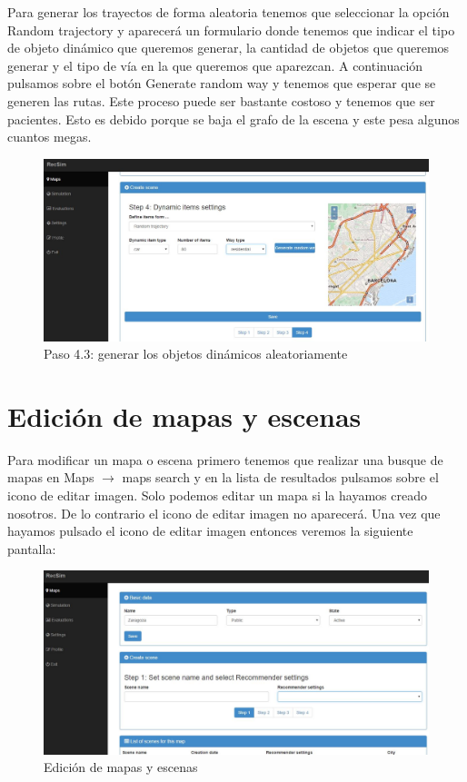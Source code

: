 Para generar los trayectos de forma aleatoria tenemos que seleccionar la opción Random trajectory y aparecerá un formulario donde tenemos que indicar el tipo de objeto dinámico que queremos generar, la cantidad de objetos que queremos generar y el tipo de vía en la que queremos que aparezcan. A continuación pulsamos sobre el botón Generate random way y tenemos que esperar que se generen las rutas. Este proceso puede ser bastante costoso y tenemos que ser pacientes. Esto es debido porque se baja el grafo de la escena y este pesa algunos cuantos megas.

\begin{figure}[H]
	\centering\includegraphics[scale=0.35]{imagenes/capitulo9/crear-escena-5.JPG}
	\caption{Paso 4.3: generar los objetos dinámicos aleatoriamente}
	\label{img:paso4-3}
\end{figure}

\section{Edición de mapas y escenas}\label{sec:editarMapasEscenas}

Para modificar un mapa o escena primero tenemos que realizar una busque de mapas en Maps $\rightarrow$ maps search y en la lista de resultados pulsamos sobre el icono de editar imagen. Solo podemos editar un mapa si la hayamos creado nosotros. De lo contrario el icono de editar imagen no aparecerá. Una vez que hayamos pulsado el icono de editar imagen entonces veremos la siguiente pantalla:

\begin{figure}[H]
	\centering\includegraphics[scale=0.35]{imagenes/capitulo10/capitulo10.jpg}
	\caption{Edición de mapas y escenas}
	\label{img:UpdateMapScene}
\end{figure}

